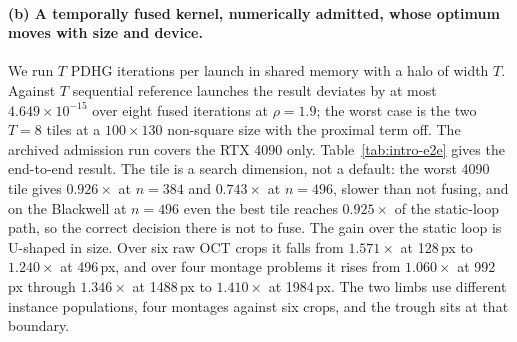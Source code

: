 \paragraph{(b) A temporally fused kernel, numerically admitted, whose optimum
moves with size and device.}
We run $T$ PDHG iterations per launch in shared memory with a halo of width
$T$.
Against $T$ sequential reference launches the result deviates by at most
$4.649\times 10^{-15}$ over eight fused iterations at $\rho=1.9$; the worst
case is the two $T=8$ tiles at a $100\times 130$ non-square size with the
proximal term off. The archived admission run covers the RTX 4090 only.
Table~\ref{tab:intro-e2e} gives the end-to-end result. The tile is a search
dimension, not a default: the worst 4090 tile gives $0.926\times$ at $n=384$
and $0.743\times$ at $n=496$, slower than not fusing,
and on the Blackwell at $n=496$ even the best tile reaches $0.925\times$ of the
static-loop path, so the correct decision there is not to fuse.
The gain over the static loop is U-shaped in size. Over six raw OCT crops it
falls from $1.571\times$ at 128\,px to $1.240\times$ at 496\,px, and over four
montage problems it rises from $1.060\times$ at 992\,px through $1.346\times$
at 1488\,px to $1.410\times$ at 1984\,px. The two limbs use different instance
populations, four montages against six crops, and the trough sits at that
boundary.

